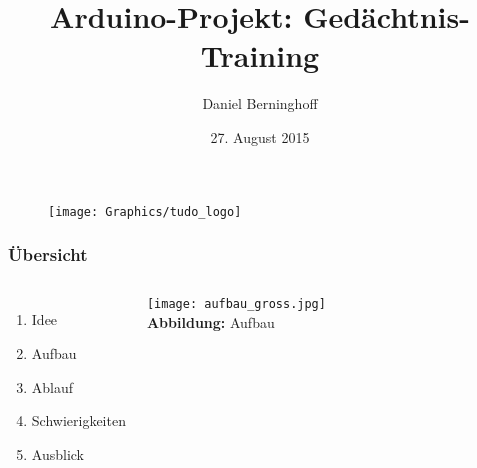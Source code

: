 \documentclass[xcolor=dvipsnames,10pt]{beamer}
\title[Arduino-Projekt]{\texorpdfstring{Arduino-Projekt: Gedächtnis-Training}{}} %
\author{Daniel Berninghoff}
\date[27. August 2015]{27. August 2015}
\def\gray{\color[rgb]{0.45,0.45,0.45}}
\begin{document}
\begin{frame}[noframenumbering]
\titlepage


\begin{figure}		%
	\texttt{[image: Graphics/tudo\_logo]}
\end{figure}



\end{frame}









\begin{frame}\frametitle{Übersicht}
	\begin{columns}[c]
		\begin{enumerate} \itemsep3ex
			\item Idee
			\item Aufbau
			\item Ablauf
			\item Schwierigkeiten
			\item Ausblick
		\end{enumerate}
		
		\texttt{[image: aufbau\_gross.jpg]}\\
		 {\small \textbf{Abbildung:} Aufbau}
	\end{columns}


\end{frame}
\end{document}

